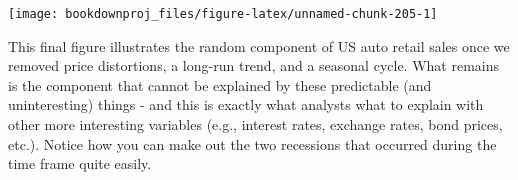 \documentclass[
]{book}
\newenvironment{Shaded}{\begin{snugshade}}{\end{snugshade}}
\newcommand{\AttributeTok}[1]{\textcolor[rgb]{0.13,0.29,0.53}{#1}}
\newcommand{\ConstantTok}[1]{\textcolor[rgb]{0.56,0.35,0.01}{#1}}
\newcommand{\DecValTok}[1]{\textcolor[rgb]{0.00,0.00,0.81}{#1}}
\newcommand{\FunctionTok}[1]{\textcolor[rgb]{0.13,0.29,0.53}{\textbf{#1}}}
\newcommand{\NormalTok}[1]{#1}
\newcommand{\OtherTok}[1]{\textcolor[rgb]{0.56,0.35,0.01}{#1}}
\newcommand{\SpecialCharTok}[1]{\textcolor[rgb]{0.81,0.36,0.00}{\textbf{#1}}}
\newcommand{\StringTok}[1]{\textcolor[rgb]{0.31,0.60,0.02}{#1}}
\begin{document}
\begin{Shaded}
\end{Shaded}

\begin{center}\texttt{[image: bookdownproj\_files/figure-latex/unnamed-chunk-205-1]} \end{center}

This final figure illustrates the random component of US auto retail sales once we removed price distortions, a long-run trend, and a seasonal cycle. What remains is the component that cannot be explained by these predictable (and uninteresting) things - and this is exactly what analysts what to explain with other more interesting variables (e.g., interest rates, exchange rates, bond prices, etc.). Notice how you can make out the two recessions that occurred during the time frame quite easily.
\end{document}
